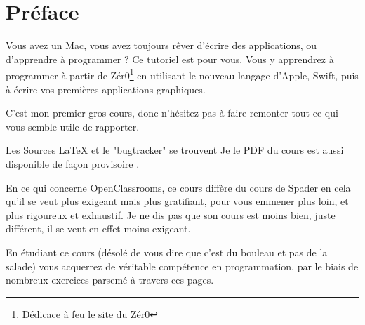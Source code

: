 \chapter*{Préface}
{}
Vous avez un Mac, vous avez toujours rêver d'écrire des applications, ou d'apprendre à programmer ?
Ce tutoriel est pour vous.
Vous y apprendrez à programmer à partir de Zér0\footnote{Dédicace à feu le site du Zér0}  en utilisant le nouveau langage d'Apple, Swift, puis à écrire vos premières applications graphiques.

C'est mon premier gros cours, donc n'hésitez pas à faire remonter tout ce qui vous semble utile de rapporter.

Les Sources LaTeX et le "bugtracker" se trouvent 
Je le PDF du cours est aussi disponible de façon provisoire .

En ce qui concerne OpenClassrooms, ce cours diffère du cours de Spader en cela qu'il se veut plus exigeant mais plus gratifiant, pour vous emmener plus loin, et plus rigoureux et exhaustif.
Je ne dis pas que son cours est moins bien, juste différent,
il se veut en effet moins exigeant.

En étudiant ce cours
(désolé de vous dire que c'est du bouleau et pas de la salade)
vous acquerrez de véritable compétence en programmation,
par le biais de nombreux exercices parsemé à travers ces pages.